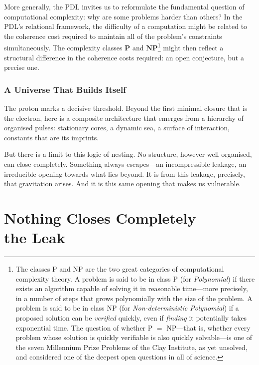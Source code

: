 \documentclass[12pt, a4paper, openright]{book}
\begin{document}
More generally, the PDL invites us to reformulate the fundamental question of computational complexity: why are some problems harder than others? In the PDL's relational framework, the difficulty of a computation might be related to the coherence cost required to maintain all of the problem's constraints simultaneously. The complexity classes $\mathbf{P}$ and $\mathbf{NP}$\footnote{The classes P and NP are the two great categories of computational complexity theory. A problem is said to be in class P (for \textit{Polynomial}) if there exists an algorithm capable of solving it in reasonable time---more precisely, in a number of steps that grows polynomially with the size of the problem. A problem is said to be in class NP (for \textit{Non-deterministic Polynomial}) if a proposed solution can be \emph{verified} quickly, even if \emph{finding} it potentially takes exponential time. The question of whether P $=$ NP---that is, whether every problem whose solution is quickly verifiable is also quickly solvable---is one of the seven Millennium Prize Problems of the Clay Institute, as yet unsolved, and considered one of the deepest open questions in all of science.} might then reflect a structural difference in the coherence costs required: an open conjecture, but a precise one.

\subsection*{A Universe That Builds Itself}

The proton marks a decisive threshold. Beyond the first minimal closure that is the electron, here is a composite architecture that emerges from a hierarchy of organised pulses: stationary cores, a dynamic sea, a surface of interaction, constants that are its imprints.

\medskip

But there is a limit to this logic of nesting. No structure, however well organised, can close completely. Something always escapes---an incompressible leakage, an irreducible opening towards what lies beyond. It is from this leakage, precisely, that gravitation arises. And it is this same opening that makes us vulnerable.

\chapter[Nothing Closes Completely --- the Leak]{Nothing Closes Completely \\ the Leak}
\end{document}
